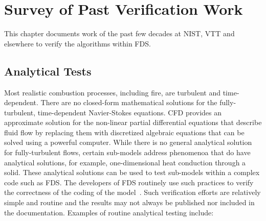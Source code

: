 \documentclass[11pt]{book}
\begin{document}
\chapter{Survey of Past Verification Work}

This chapter documents work of the past few decades at NIST, VTT and elsewhere to verify the algorithms within FDS.




\section{Analytical Tests}

\label{Analytical Tests}

Most realistic combustion processes, including fire, are turbulent and time-dependent. There are no closed-form mathematical solutions for the
fully-turbulent, time-dependent Navier-Stokes equations. CFD provides an approximate solution for the non-linear partial differential equations that describe fluid flow by
replacing them with discretized algebraic equations that can be solved using a powerful computer. While there is no general analytical solution for
fully-turbulent flows, certain sub-models address phenomenoa that do have analytical solutions, for example, one-dimensional heat conduction through
a solid. These analytical solutions can be used to test sub-models within a complex code such as FDS. The developers of FDS routinely use such
practices to verify the correctness of the coding of the model~\cite{Mell:1,McGrattan:4}. Such verification efforts are relatively simple and routine
and the results may not always be published nor included in the documentation. Examples of routine analytical testing include:
\end{document}

